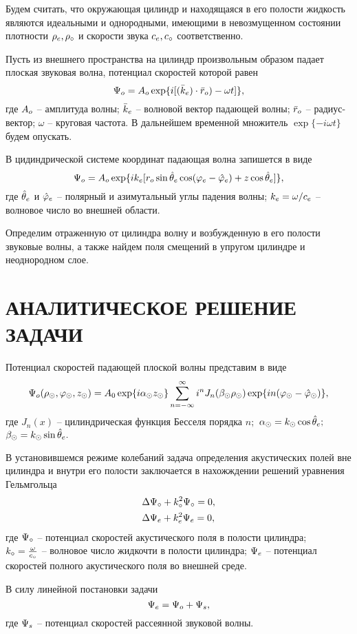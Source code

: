 Будем считать, что окружающая цилиндр и находящаяся в его полости жидкость являются идеальными и однородными, имеющими в невозмущенном состоянии плотности $\r\en, \r\c$ и скорости звука $c\en, c\c$ соответственно.

Пусть из внешнего пространства на цилиндр произвольным образом падает плоская звуковая волна, потенциал скоростей которой равен
$$\P\o=A\o \exp\{i[(\bar{k}\en)\cdot \bar{r}\o)-\omega t]\},$$
где $A\o$ -- амплитуда волны; $\bar{k}\en$ -- волновой вектор падающей волны; $\bar{r}\o$ -- радиус-вектор; $\omega$ -- круговая частота. В дальнейшем временной множитель $\exp\{-i\omega t\}$ будем опускать.

В цидиндрической системе координат падающая волна запишется в виде
$$\P\o=A\o\exp\{ik\en[r\o\sin{\hat{\theta}\en}\cos(\f\en-\hat{\f}\en)+z\cos\hat{\Q}\en]\},$$
где $\hat{\theta}\en$ и $\hat{\f}\en$ -- полярный и азимутальный углы падения волны; $k\en=\omega / c\en$ -- волновое число во внешней области.

Определим отраженную от цилиндра волну и возбужденную в его полости звуковые волны, а также найдем поля смещений в упругом цилиндре и неоднородном слое.

\newpage
\section{АНАЛИТИЧЕСКОЕ РЕШЕНИЕ ЗАДАЧИ}

Потенциал скоростей падающей плоской волны представим в виде
$$\P\o(\r\cyl, \f\cyl, z\cyl)=A_0\exp\{i\alpha\cyl z\cyl\}\sum_{n=-\infty}^{\infty}i^nJ_n(\beta\cyl \r\cyl)\exp\{in(\f\cyl-\hat\f\cyl)\},$$
где $J_n(x)$ -- цилиндрическая функция Бесселя порядка $n;$ $\alpha\cyl=k\cyl\cos\hat\theta\en;$ \\$\beta\cyl=k\cyl\sin\hat\theta\en.$

В установившемся режиме колебаний задача определения акустических полей вне цилиндра и внутри его полости заключается в нахожждении решений уравнения Гельмгольца
\begin{align}
&\Lap\P\c+k\c^2\P\c=0,\\
&\Lap\P\en+k\en^2\P\en=0\label{eq_gel_for_enviroment},
\end{align}
где $\P\c$ -- потенциал скоростей акустического поля в полости цилиндра;\\ $k\c=\frac{\omega}{c\c}$ -- волновое число жидкочти в полости цилиндра;
$\P\en$ -- потенциал скоростей полного акустического поля во внешней среде. 

В силу линейной постановки задачи
\begin{equation}
\P\en=\P\o+\P_s,
\end{equation}
где $\P_s$ -- потенциал скоростей рассеянной звуковой волны.


